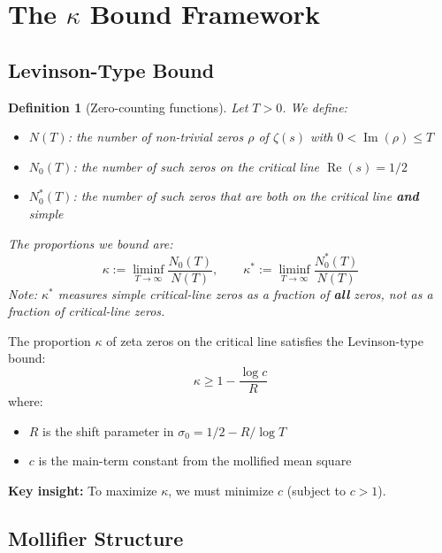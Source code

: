 \documentclass[11pt]{article}
\newtheorem{definition}{Definition}
\begin{document}
\section{The $\kappa$ Bound Framework}
\label{sec:framework}

\subsection{Levinson-Type Bound}

\begin{definition}[Zero-counting functions]
\label{def:zero-counting}
Let $T > 0$. We define:
\begin{itemize}
\item $N(T)$: the number of non-trivial zeros $\rho$ of $\zeta(s)$ with $0 < \operatorname{Im}(\rho) \leq T$
\item $N_0(T)$: the number of such zeros on the critical line $\operatorname{Re}(s) = 1/2$
\item $N_0^*(T)$: the number of such zeros that are both on the critical line \textbf{and} simple
\end{itemize}
The proportions we bound are:
\[
\kappa := \liminf_{T \to \infty} \frac{N_0(T)}{N(T)}, \qquad
\kappa^* := \liminf_{T \to \infty} \frac{N_0^*(T)}{N(T)}
\]
Note: $\kappa^*$ measures simple critical-line zeros as a fraction of \textbf{all} zeros, not as a fraction of critical-line zeros.
\end{definition}

The proportion $\kappa$ of zeta zeros on the critical line satisfies the Levinson-type bound:
\begin{equation}
\boxed{\kappa \geq 1 - \frac{\log c}{R}}
\end{equation}
where:
\begin{itemize}
\item $R$ is the shift parameter in $\sigma_0 = 1/2 - R/\log T$
\item $c$ is the main-term constant from the mollified mean square
\end{itemize}

\textbf{Key insight:} To maximize $\kappa$, we must minimize $c$ (subject to $c > 1$).

\subsection{Mollifier Structure}
\end{document}
